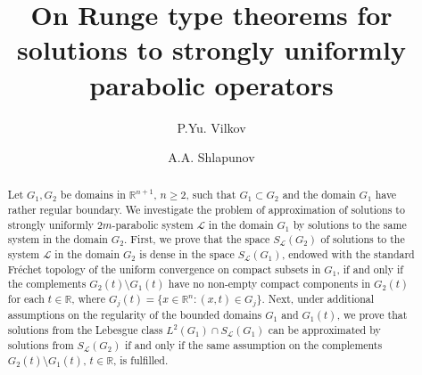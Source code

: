 \documentclass{amsart}
\theoremstyle{definition}
\theoremstyle{remark}
\numberwithin{equation}{section}
\begin{document}
\title[On Runge type theorems]{On Runge type theorems for solutions to 
strongly uniformly parabolic operators }

\author{P.Yu. Vilkov}

\address[Pavel Vilkov]
{Siberian Federal University
                                                 \\
         pr. Svobodnyi 79
                                                 \\
         660041 Krasnoyarsk
                                                 \\
         Russia}

\author{A.A. Shlapunov}

\address[Alexander Shlapunov]
{Siberian Federal University
                                                 \\
         pr. Svobodnyi 79
                                                 \\
         660041 Krasnoyarsk
                                                 \\
         Russia}

\address{Sirius Mathematics Center
Sirius University of Science and Technology, Olimpiyskiy ave. b.1, 354349 Sochi,
         Russia}


\begin{abstract}
Let $G_1, G_2 $ be  domains in ${\mathbb R}^{n+1}$, $n \geq 2$, such that $G_1 \subset G_2$ 
and the domain $G_1$ have rather regular boundary. We investigate the problem of 
approximation of solutions to strongly uniformly $2m$-parabolic  system $\mathcal L$ in the 
domain $G_1$  by solutions to the same system in the  domain 
$G_2$. First, we prove that the space  $S _{\mathcal L}(G_2)$ of solutions to the system 
$\mathcal L$ in the domain $G_2$  is dense in the space $S _{\mathcal L}(G_1)$, endowed with  
the standard Fr\'echet topology of the uniform convergence on compact subsets in $G_1$, if 
and only if  the complements $G_2 (t) \setminus G_1 (t)$ have no non-empty compact components 
in  $G_2 (t)$ for each $t\in \mathbb R$, where $G_j (t) = \{x \in {\mathbb R}^n: (x,t) \in 
G_j\}$. Next, under additional  assumptions on the regularity of the bounded domains $G_1$ and 
$G_1(t)$, we prove that solutions from the Lebesgue class $L^2(G_1)\cap S _{\mathcal L}(G_1)$ 
can be approximated by solutions from $S _{\mathcal L}(G_2)$ if and only if  the same 
assumption on the  complements $G_2 (t) \setminus G_1 (t)$, $t\in \mathbb R$, is fulfilled.
\end{abstract}
\end{document}
